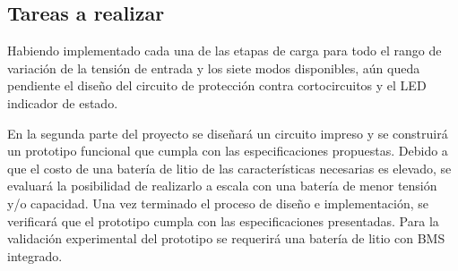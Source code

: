 \subsection{Tareas a realizar}
Habiendo implementado cada una de las etapas de carga para todo el rango de variación de la tensión de entrada y los siete modos disponibles, 
aún queda pendiente el diseño del circuito de protección contra cortocircuitos y el LED indicador de estado.  

En la segunda parte del proyecto se diseñará un circuito impreso y se construirá un prototipo funcional que cumpla con las especificaciones propuestas. 
Debido a que el costo de una batería de litio de las características necesarias es elevado,
se evaluará la posibilidad de realizarlo a escala con una batería de menor tensión y/o capacidad.
Una vez terminado el proceso de diseño e implementación, se verificará que el prototipo cumpla con las especificaciones presentadas.
Para la validación experimental del prototipo se requerirá una batería de litio con BMS integrado. 